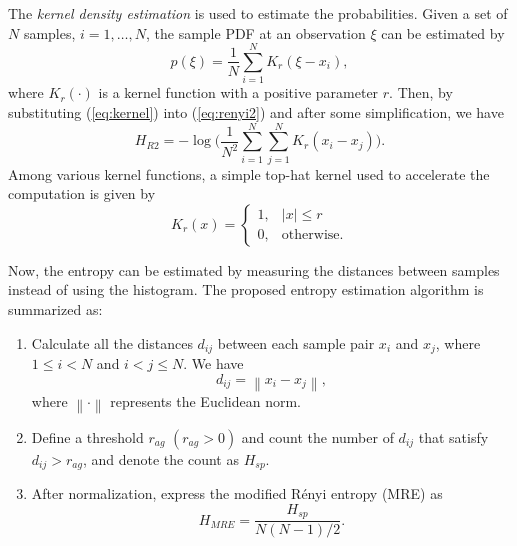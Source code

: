 \documentclass[journal,comsoc,onecolumn, 12pt,draftclsnofoot]{IEEEtran}
\begin{document}
The \textit{kernel density estimation} is used to estimate the probabilities.
Given a set of \(N\) samples, \(i=1, \dots, N\), the sample PDF at an observation \(\xi\) can be estimated by~\cite{Principe2000a}
\begin{equation}
{ p(\xi)={\frac {1}{N}}\sum _{i=1}^{N}K_{r}\left(\xi-x_i\right)},
\label{eq:kernel}
\end{equation}
where $K_r(\cdot)$ is a kernel function with a positive parameter $r$.
Then, by substituting (\ref{eq:kernel}) into (\ref{eq:renyi2}) and after some simplification, we have
\begin{equation}
H_{R2 }=-\log {\Bigg (}\frac{1}{N^2}\sum _{i=1}^{N}\sum _{j=1}^{N}K_{r}\left(x_i-x_j\right){\Bigg )}.
\end{equation}
Among various kernel functions, a simple top-hat kernel used to accelerate the computation is given by
\begin{equation}
{\displaystyle K_{r}(x)={\begin{cases}1,&|x|\leq r\\0,&{\mbox{otherwise.}}\end{cases}}}
\end{equation}

Now, the entropy can be estimated by  measuring the distances between samples instead of using the histogram.
The proposed entropy estimation algorithm is summarized as:
\begin{enumerate}
\item Calculate all the distances \(d_{ij}\) between each sample pair \(x_i\) and \(x_j\), where \(1\le i<N\) and \( i<j \le N\). We have
 \begin{equation}
d_{ij}=\left\|x_i-x_j \right\|,
\label{eq:distance}
\end{equation}
where \(\left\| \cdot \right\|\) represents the Euclidean norm.
\item Define a threshold \(r_{ag}\) \((r_{ag}>0)\) and count the number of \(d_{ij}\) that satisfy $d_{ij}>r_{ag}$, and denote the count as $H_{sp}$.
\item After normalization, express the modified R\'enyi entropy (MRE) as
\begin{equation}
H_{MRE}= \frac{ H_{sp}}{ N(N-1)/2}.
\label{eq:entorpy_ad}
\end{equation}
\end{enumerate}
\end{document}
